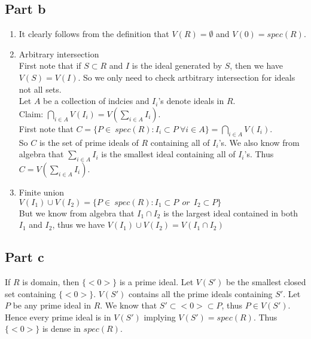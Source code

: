 \documentclass[12pt]{article}
\begin{document}
\subsection*{Part b}
\begin{enumerate}
\item It clearly follows from the definition that
$V(R)=\emptyset$ and $V(0)=spec(R)$.
\item Arbitrary intersection \\
First note that if $S \subset R$ and $I$ is the ideal generated by $S$, then we have $V(S)=V(I)$. So we only need to check artbitrary intersection for ideals not all sets. \\
Let $A$ be a collection of indcies and $I_i$'s denote ideals in $R$. \\
Claim: $\bigcap_{i \in A} V(I_i) = V(\sum_{i \in A} I_i)$. \\
First note that $C=\{P \in \ spec(R): I_i \subset P \ \forall i \in A\}=\bigcap_{i \in A} V(I_i)$. \\
So $C$ is the set of prime ideals of $R$ containing all of $I_i$'s. We also know from algebra that $\sum_{i \in A} I_i$ is the smallest ideal containing all of $I_i$'s. Thus $C=V(\sum_{i \in A} I_i)$. 
\item Finite union \\
$V(I_1) \cup V(I_2) = \{P \in \ spec(R): I_1 \subset P 
\ \ or \ \ I_2 \subset P\}$ \\
But we know from algebra that $I_1 \cap I_2$ is the largest ideal contained in both $I_1$ and $I_2$, thus we have
$V(I_1) \cup V(I_2)=V(I_1 \cap I_2)$
\end{enumerate}
\subsection*{Part c}
If $R$ is domain, then $\{<0>\}$ is a prime ideal.
Let $V(S')$ be the smallest closed set containing $\{<0>\}$.
$V(S')$ contains all the prime ideals containing $S'$. Let $P$ be any prime ideal in $R$. We know that $S' \subset <0> \subset P$, thus $P \in V(S')$. Hence every prime ideal is in $V(S')$ implying $V(S')=spec(R)$. Thus $\{<0>\}$ is dense in $spec(R)$.

\clearpage
\end{document}
